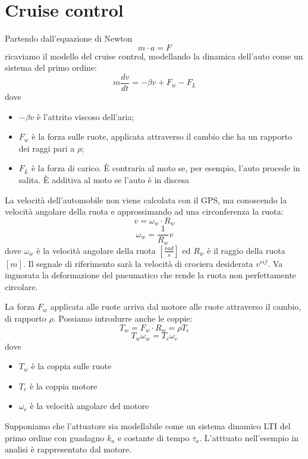 \documentclass[a4paper]{report}
\begin{document}
\section{Cruise control}
Partendo dall'equazione di Newton
\[
m \cdot a = F
\]
ricaviamo il modello del cruise control, modellando la dinamica
dell'auto come un sistema del primo ordine:
\begin{equation}\label{eq:cruise01}
  m \dfrac{dv}{dt} = - \beta v + F_w - F_L
\end{equation}
dove
\begin{itemize}
\item $- \beta v$ \`e l'attrito viscoso dell'aria;
\item $F_w$ \`e la forza sulle ruote, applicata attraverso il cambio
  che ha un rapporto dei raggi pari a $\rho$;
\item $F_L$ \`e la forza di carico. \`E contraria al moto se, per
  esempio, l'auto procede in salita. \`E additiva al moto se l'auto
  \`e in discesa
\end{itemize}
La velocit\`a dell'automobile non viene calcolata con il GPS, ma
conoscendo la velocit\`a angolare della ruota e approssimando ad una
circonferenza la ruota:
\[
v = \omega_w \cdot R_w
\]
\[
\omega_w = \dfrac{1}{R_w} v
\]
dove $\omega_w$ \`e la velocit\`a angolare della ruota $\left[
  \frac{rad}{s}\right]$ ed $R_w$ \`e il raggio della ruota $[m]$. Il
segnale di riferimento sar\`a la velocit\`a di crociera desiderata
$v^{rif}$. Va ingnorata la deformazione del pneumatico che rende la
ruota non perfettamente circolare.

La forza $F_w$ applicata alle ruote arriva dal motore alle ruote
attraverso il cambio, di rapporto $\rho$. Possiamo introdurre anche le
coppie:
\[
T_w = F_w \cdot R_w = \rho T_e
\]
\[
T_w \omega_w = T_e \omega_e
\]
dove
\begin{itemize}
\item $T_w$ \`e la coppia sulle ruote
\item $T_e$ \`e la coppia motore
\item $\omega_e$ \`e la velocit\`a angolare del motore
\end{itemize}

Supponiamo che l'attuatore sia modellabile come un sistema dinamico
LTI del primo ordine con guadagno $k_a$ e costante di tempo
$\tau_a$. L'atttuato nell'esempio in analisi \`e rappresentato dal
motore. 
\end{document}
